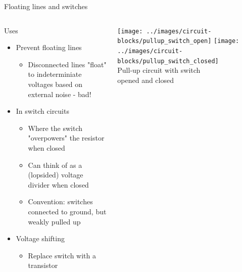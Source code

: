 \documentclass{beamer}
\begin{document}
\begin{frame}{Floating lines and switches}
  \begin{columns}[T]
    \begin{column}{.6\textwidth}
	  Uses
      \begin{itemize}
        \item Prevent floating lines
        \begin{itemize}
          \item Disconnected lines "float" to indeterminiate voltages based on external noise - bad!
        \end{itemize}
        \item In switch circuits
        \begin{itemize}
          \item Where the switch "overpowers" the resistor when closed
          \item Can think of as a (lopsided) voltage divider when closed
          \item Convention: switches connected to ground, but weakly pulled up
        \end{itemize}
        \item Voltage shifting
        \begin{itemize}
          \item Replace switch with a transistor
        \end{itemize}
      \end{itemize}
    \end{column}

    \begin{column}{0.4\textwidth} \centering
      \texttt{[image: ../images/circuit-blocks/pullup\_switch\_open]}
      \texttt{[image: ../images/circuit-blocks/pullup\_switch\_closed]} \\
      Pull-up circuit with switch \\
      opened and closed
    \end{column}
  \end{columns}
\end{frame}
\end{document}
